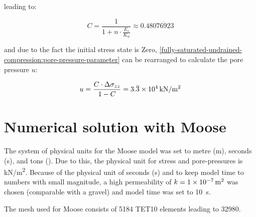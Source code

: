 \vspace{1em}

leading to:

\begin{equation}
    C = \frac{1}{1 + n \cdot \frac{E_s}{K_w}} \approx 0.48\overline{076923}
\end{equation}

and due to the fact the initial stress state is Zero,
\autoref{fully-saturated-undrained-compression:pore-pressure-parameter} can be
rearranged to calculate the pore pressure $u$:

\begin{equation}
    u = \frac{C \cdot \Delta \sigma_{zz}}{1 - C} =
    3.\overline{3}\times\SI{E4}{\si[per-mode =
            symbol]{\kilo\newton\per\square\metre}}
\end{equation}


\section{Numerical solution with Moose}

The system of physical units for the Moose model was set to metre
(\unit{\metre}), seconds (\unit{\second}), and tons (\unit{\ton}). Due to this,
the physical unit for stress and pore-pressures is \unit[per-mode =
    symbol]{\kilo\newton\per\square\metre}. Because of the physical unit of seconds
(\unit{\second}) and to keep model time to numbers with small magnitude, a high
permeability of $k = \qty{1E-7}{\square\metre}$ was chosen (comparable with a
gravel) and model time was set to \qty{10}{\second}.

The mesh used for Moose consists of \qty{5184}{} TET10 elements leading to
\qty{32980}{\DOF}.

